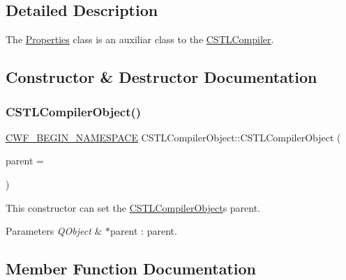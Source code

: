\subsection{Detailed Description}
The \hyperlink{class_properties}{Properties} class is an auxiliar class to the \hyperlink{class_c_s_t_l_compiler}{C\+S\+T\+L\+Compiler}. 

\subsection{Constructor \& Destructor Documentation}
\mbox{\label{class_c_s_t_l_compiler_object_a31f110c6081112d484a85348520b0678}} 
\subsubsection{\texorpdfstring{C\+S\+T\+L\+Compiler\+Object()}{CSTLCompilerObject()}}
{\footnotesize\ttfamily \hyperlink{cppwebframework__global_8h_a7492e9498cbaf9cd17dbc2215d3a0e48}{C\+W\+F\+\_\+\+B\+E\+G\+I\+N\+\_\+\+N\+A\+M\+E\+S\+P\+A\+CE} C\+S\+T\+L\+Compiler\+Object\+::\+C\+S\+T\+L\+Compiler\+Object (\begin{DoxyParamCaption}\item[{Q\+Object $\ast$}]{parent = {} }\end{DoxyParamCaption})\hspace{0.3cm}{\ttfamily [explicit]}}



This constructor can set the \hyperlink{class_c_s_t_l_compiler_object}{C\+S\+T\+L\+Compiler\+Object}\textquotesingle{}s parent. 


\begin{DoxyParams}{Parameters}
{\em Q\+Object} & $\ast$parent \+: parent. \\
\hline
\end{DoxyParams}


\subsection{Member Function Documentation}
\mbox{\label{class_c_s_t_l_compiler_object_a3e853137310474444650ad78e307b9a8}} 
